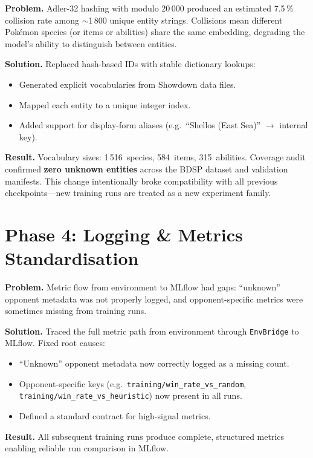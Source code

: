 \textbf{Problem.} Adler-32 hashing with modulo 20\,000 produced an estimated
7.5\,\% collision rate among $\sim$1\,800 unique entity strings.  Collisions
mean different Pok\'{e}mon species (or items or abilities) share the same
embedding, degrading the model's ability to distinguish between entities.

\textbf{Solution.} Replaced hash-based IDs with stable dictionary lookups:

\begin{itemize}
  \item Generated explicit vocabularies from Showdown data files.
  \item Mapped each entity to a unique integer index.
  \item Added support for display-form aliases (e.g.\ ``Shellos (East Sea)''
        $\to$ internal key).
\end{itemize}

\textbf{Result.} Vocabulary sizes: 1\,516~species, 584~items, 315~abilities.
Coverage audit confirmed \textbf{zero unknown entities} across the BDSP
dataset and validation manifests.  This change intentionally broke
compatibility with all previous checkpoints---new training runs are treated as
a new experiment family.

\section{Phase 4: Logging \& Metrics Standardisation}

\textbf{Problem.} Metric flow from environment to MLflow had gaps:
``unknown'' opponent metadata was not properly logged, and opponent-specific
metrics were sometimes missing from training runs.

\textbf{Solution.} Traced the full metric path from environment through
\texttt{EnvBridge} to MLflow.  Fixed root causes:
\begin{itemize}
  \item ``Unknown'' opponent metadata now correctly logged as a missing count.
  \item Opponent-specific keys (e.g.\
        \texttt{training/win\_rate\_vs\_random},
        \texttt{training/win\_rate\_vs\_heuristic}) now present in all runs.
  \item Defined a standard contract for high-signal metrics.
\end{itemize}

\textbf{Result.} All subsequent training runs produce complete, structured
metrics enabling reliable run comparison in MLflow.


